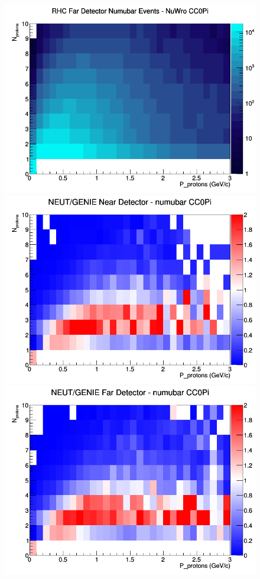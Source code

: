\documentclass[12pt]{article}
\begin{document}
\begin{figure}[h]
\endminipage
{}
\includegraphics[width=\linewidth]{N_P/nominal/protons/CC0Pi_RHC_FD_numubar_N_P_NuWro.png}
\endminipage
\newline
{}
\includegraphics[width=\linewidth]{N_P/nominal/protons/ratios/CC0Pi_NEUT_GENIE_numubar_near_N_P.png}
\endminipage
{}
\includegraphics[width=\linewidth]{N_P/nominal/protons/ratios/CC0Pi_NEUT_GENIE_numubar_far_N_P.png}

\end{figure}
\end{document}
